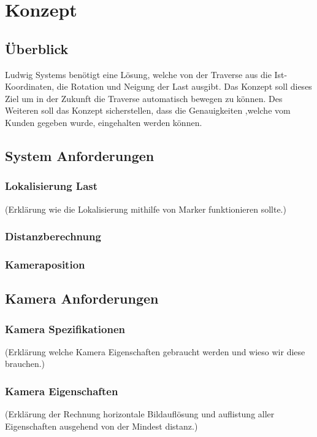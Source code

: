 \section{Konzept}


\subsection{Überblick}
Ludwig Systems benötigt eine Lösung, welche von der Traverse aus die Ist-Koordinaten, die Rotation und Neigung der Last ausgibt. Das Konzept soll dieses Ziel um in der Zukunft die Traverse automatisch bewegen zu können. Des Weiteren soll das Konzept sicherstellen, dass die Genauigkeiten ,welche vom Kunden gegeben wurde, eingehalten werden können.

\subsection{System Anforderungen}

\subsubsection{Lokalisierung Last}
(Erklärung wie die Lokalisierung mithilfe von Marker funktionieren sollte.)

\subsubsection{Distanzberechnung}
\subsubsection{Kameraposition}

\subsection{Kamera Anforderungen}
\subsubsection{Kamera Spezifikationen}
(Erklärung welche Kamera Eigenschaften gebraucht werden und wieso wir diese brauchen.)

\subsubsection{Kamera Eigenschaften}
(Erklärung der Rechnung horizontale Bildauflösung und auflistung aller Eigenschaften ausgehend von der Mindest distanz.)


